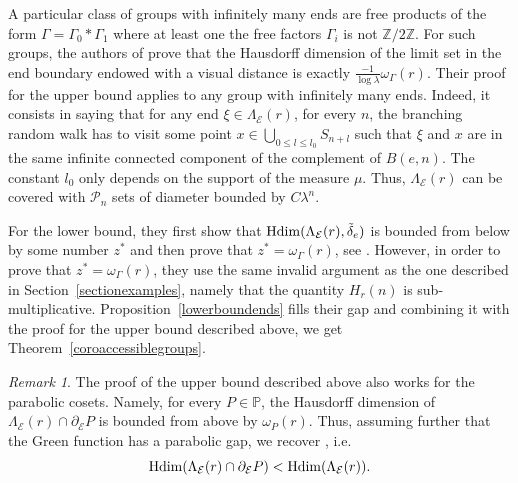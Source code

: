 \documentclass{amsart}
\theoremstyle{definition}
\theoremstyle{remark}
\newtheorem{rem}[thm]{Remark}
\newcommand{\Hdim}{{\rm Hdim}}
\begin{document}
A particular class of groups with infinitely many ends are free products of the form $\Gamma=\Gamma_0*\Gamma_1$ where at least one the free factors $\Gamma_i$ is not $\mathbb Z/2\mathbb Z$.
For such groups, the authors of \cite{CandelleroGilchMuller} prove that the Hausdorff dimension of the limit set in the end boundary endowed with a visual distance is exactly $\frac{-1}{\log \lambda}\omega_{\Gamma}(r)$.
Their proof for the upper bound applies to any group with infinitely many ends.
Indeed, it consists in saying that for any end $\xi\in \Lambda_{\mathcal{E}}(r)$, for every $n$, the branching random walk has to visit some point $x\in \bigcup_{0\leq l\leq l_0}S_{n+l}$ such that $\xi$ and $x$ are in the same infinite connected component of the complement of $B(e,n)$.
The constant $l_0$ only depends on the support of the measure $\mu$.
Thus, $\Lambda_{\mathcal{E}}(r)$ can be covered with $\mathcal{P}_n$ sets of diameter bounded by $C\lambda^n$.

For the lower bound, they first show that
$\Hdim (\Lambda_{\mathcal{E}}(r),\tilde{\delta}_e)$ is bounded from below by some number $z^*$ and then prove that $z^*=\omega_\Gamma(r)$, see \cite[Lemma~4.7]{CandelleroGilchMuller}.
However, in order to prove that $z^*=\omega_\Gamma(r)$, they use the same invalid argument as the one described in Section~\ref{sectionexamples}, namely that the quantity $H_r(n)$ is sub-multiplicative.
Proposition~\ref{lowerboundends} fills their gap and
combining it with the proof for the upper bound described above, we get Theorem~\ref{coroaccessiblegroups}.

\begin{rem}\label{CGMCor}
The proof of the upper bound described above also works for the parabolic cosets.
Namely, for every $P\in \mathbb P$, the Hausdorff dimension of $\Lambda_{\mathcal{E}}(r)\cap \partial_{\mathcal{E}}P$ is bounded from above by $\omega_{P}(r)$.
Thus, assuming further that the Green function has a parabolic gap, we recover \cite[Corollary~3.7]{CandelleroGilchMuller}, i.e.\
$$\Hdim(\Lambda_{\mathcal{E}}(r)\cap \partial_{\mathcal{E}}P)<\Hdim (\Lambda_{\mathcal{E}}(r)).$$
\end{rem}
\end{document}
